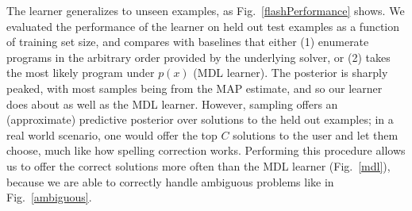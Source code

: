 \documentclass{article}
\begin{document}
The learner generalizes to unseen examples, as Fig.~\ref{flashPerformance} shows.
We evaluated the performance of the learner on held out test examples as a function of training set size, and compares with baselines that either (1) enumerate programs in the arbitrary order provided by the underlying solver,
or (2) takes the most likely program under $p(x)$ (MDL learner).
The posterior is sharply peaked,
with most samples being from the MAP estimate,
and so our learner does about as well as the MDL learner.
However,
sampling offers an (approximate) predictive posterior over solutions to the held out examples;
in a real world scenario, one would offer the top $C$ solutions to the user
and let them choose,
much like how spelling correction works.
Performing this procedure allows us to offer the correct solutions more often than the MDL learner (Fig.~\ref{mdl}), because we are able to correctly handle ambiguous problems like in Fig.~\ref{ambiguous}.
\end{document}
